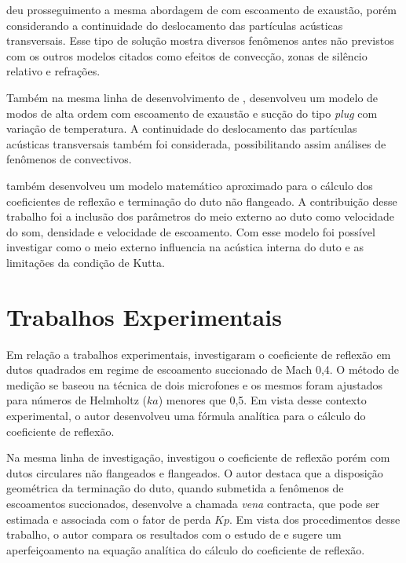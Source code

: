  deu prosseguimento a mesma abordagem de  com escoamento de exaustão, porém considerando a continuidade do deslocamento das partículas acústicas transversais. Esse tipo de solução mostra diversos fenômenos antes não previstos com os outros modelos citados como efeitos de convecção, zonas de silêncio relativo e refrações.

Também na mesma linha de desenvolvimento de ,  desenvolveu um modelo de modos de alta ordem com escoamento de exaustão e sucção do tipo \textit{plug} com variação de temperatura. A continuidade do deslocamento das partículas acústicas transversais também foi considerada, possibilitando assim análises de fenômenos de convectivos.

 também desenvolveu um modelo matemático aproximado para o cálculo dos coeficientes de reflexão e terminação do duto não flangeado. A contribuição desse trabalho foi a inclusão dos parâmetros do meio externo ao duto como velocidade do som, densidade e velocidade de escoamento. Com esse modelo foi possível investigar como o meio externo influencia na acústica interna do duto e as limitações da condição de Kutta.

\section{Trabalhos Experimentais}

Em relação a trabalhos experimentais,  investigaram o coeficiente de reflexão em dutos quadrados em regime de escoamento succionado de Mach 0,4. O método de medição se baseou na técnica de dois microfones e os mesmos foram ajustados para números de Helmholtz ($ka$) menores que 0,5. Em vista desse contexto experimental, o autor desenvolveu uma fórmula analítica para o cálculo do coeficiente de reflexão.

Na mesma linha de investigação,  investigou o coeficiente de reflexão porém com dutos circulares não flangeados e flangeados. O autor destaca que a disposição geométrica da terminação do duto, quando submetida a fenômenos de escoamentos succionados, desenvolve a chamada \textit{vena} contracta, que pode ser estimada e associada com o fator de perda $Kp$. Em vista dos procedimentos desse trabalho, o autor compara os resultados com o estudo de  e sugere um aperfeiçoamento na equação analítica do cálculo do coeficiente de reflexão.


